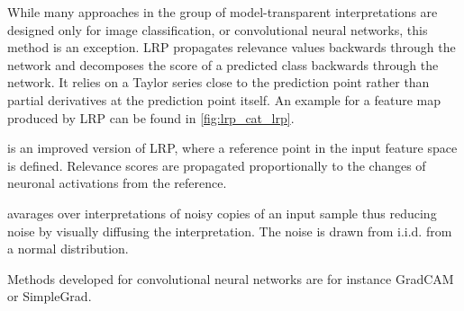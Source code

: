  While many approaches in the group of model-transparent interpretations are designed only for image classification, or convolutional neural networks, this method \cite{bach2015pixel} is an exception. LRP propagates relevance values backwards through the network and decomposes the score of a predicted class backwards through the network. It relies on a Taylor series close to the prediction point rather than partial derivatives at the prediction point itself. An example for a feature map produced by LRP can be found in \autoref{fig:lrp_cat_lrp}.

 \cite{shrikumar2017learning} is an improved version of LRP, where a reference point in the input feature space is defined. Relevance scores are propagated proportionally to the changes of neuronal activations from the reference. %

 \cite{smilkov2017smoothgrad} avarages over interpretations of noisy copies of an input sample thus reducing noise by visually diffusing the interpretation. The noise is drawn from i.i.d. from a normal distribution. 

Methods developed for convolutional neural networks are for instance GradCAM \cite{selvaraju2017grad} or SimpleGrad. %